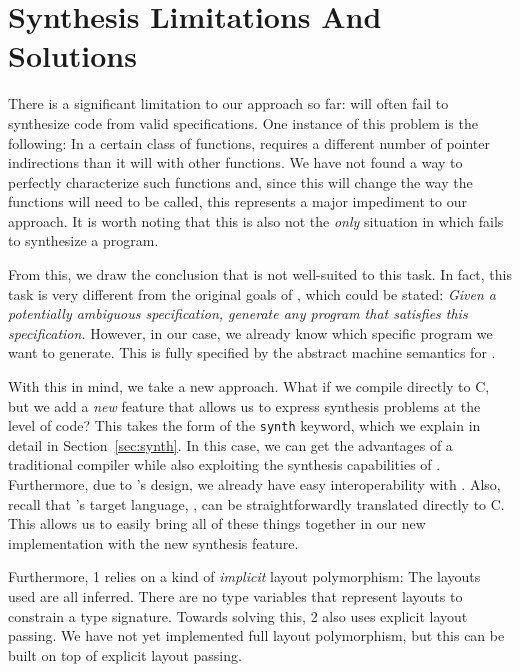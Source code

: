 \section{Synthesis Limitations And Solutions}
\label{sec:limitations}

There is a significant limitation to our approach so far: \SuSLik{} will often fail to synthesize code from valid specifications. One instance of this problem is the following: In a certain class of functions, \SuSLik{} requires a different number of pointer indirections than it will with other functions. We have not found a way to perfectly characterize such functions and, since this will change the way the functions will need to be called, this represents a major impediment to our approach. It is worth noting that this is also not the \textit{only} situation in which \SuSLik{} fails to synthesize a program.

From this, we draw the conclusion that \SuSLik{} is not well-suited to this task. In fact, this task is very different from the original goals of \SuSLik, which could be stated: \textit{Given a potentially ambiguous specification, generate any program that satisfies this specification.} However, in our case, we already know which specific program we want to generate. This is fully specified by the abstract machine semantics for \Pika.

With this in mind, we take a new approach. What if we compile \Pika{} directly to C, but we add a \textit{new} feature that allows us to express synthesis problems at the level of \Pika{} code? This takes the form of the \verb|synth| keyword, which we explain in detail in Section~\ref{sec:synth}. In this case, we can get the advantages of a traditional compiler while also exploiting the synthesis capabilities of \SuSLik. Furthermore, due to \Pika's design, we already have easy interoperability with \SuSLik. Also, recall that \SuSLik's target language, \SuSLang, can be straightforwardly translated directly to C. This allows us to easily bring all of these things together in our new implementation with the new \Pika{} synthesis feature.

Furthermore, \Pika{} 1 relies on a kind of \textit{implicit} layout polymorphism: The layouts used are all inferred. There are no type variables that represent layouts to constrain a type signature. Towards solving this, \Pika{} 2 also uses explicit layout passing. We have not yet implemented full layout polymorphism, but this can be built on top of explicit layout passing.

